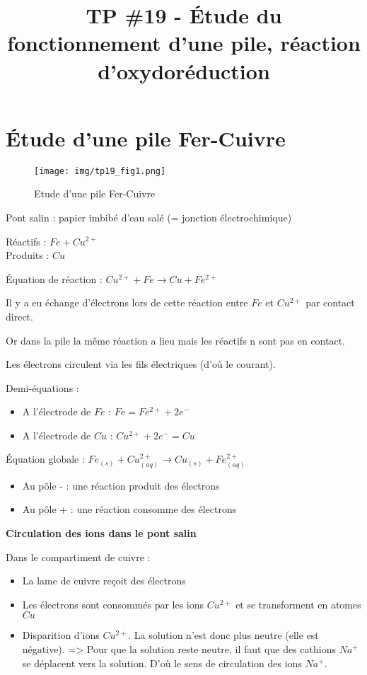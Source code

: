 \documentclass[12pt]{article}
\title{\textbf{TP \#19 - Étude du fonctionnement d'une pile, réaction d'oxydoréduction}}
\date{}
\begin{document}
\maketitle

\section{}
\section{Étude d'une pile Fer-Cuivre}

\begin{figure}[htp]
\centering
\texttt{[image: img/tp19\_fig1.png]}
\caption{Etude d'une pile Fer-Cuivre}
\label{}
\end{figure}

Pont salin : papier imbibé d'eau salé (= jonction électrochimique)

Réactifs : $Fe + Cu^{2+}$ \\
Produits : $Cu$

Équation de réaction : $Cu^{2+} + Fe \rightarrow Cu + Fe^{2+}$

Il y a eu échange d'électrons lors de cette réaction entre $Fe$ et $Cu^{2+}$ par contact direct.

Or dans la pile la même réaction a lieu mais les réactifs n sont pas en contact.

Les électrons circulent via les fils électriques (d'où le courant).

Demi-équations :
\begin{itemize}
\item A l'électrode de $Fe$ : $Fe = Fe^{2+} + 2e^-$
\item A l'électrode de $Cu$ : $Cu^{2+} + 2e^- = Cu$
\end{itemize}

Équation globale : $Fe_{(s)} + Cu^{2+}_{(aq)} \rightarrow Cu_{(s)} + Fe^{2+}_{(aq)}$

\begin{itemize}
\item Au pôle - : une réaction produit des électrons
\item Au pôle + : une réaction consomme des électrons
\end{itemize}

\textbf{Circulation des ions dans le pont salin}

Dans le compartiment de cuivre :
\begin{itemize}
\item La lame de cuivre reçoit des électrons
\item Les électrons sont consommés par les ions $Cu^{2+}$ et se transforment en atomes $Cu$
\item Disparition d'ions $Cu^{2+}$. La solution n'est donc plus neutre (elle est négative).
=> Pour que la solution reste neutre, il faut que des cathions $Na^+$ se déplacent vers la solution. D'où le sens de circulation des ions $Na^+$.
\end{itemize}
\end{document}
